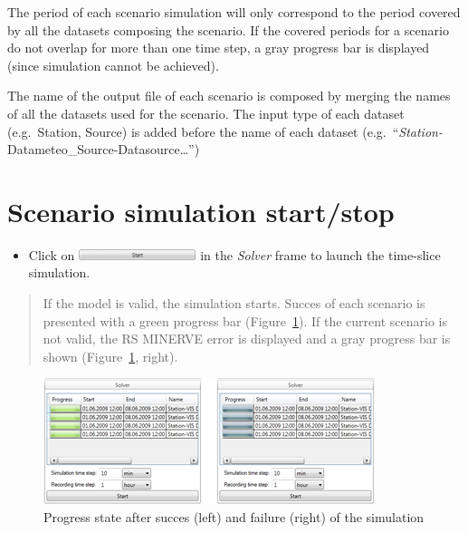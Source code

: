 \documentclass[
  letterpaper,
  DIV=11,
  numbers=noendperiod]{scrreprt}
\providecommand{\tightlist}{%
  \setlength{\itemsep}{0pt}\setlength{\parskip}{0pt}}\usepackage{longtable,booktabs,array}
\begin{document}
The period of each scenario simulation will only correspond to the
period covered by all the datasets composing the scenario. If the
covered periods for a scenario do not overlap for more than one time
step, a gray progress bar is displayed (since simulation cannot be
achieved).

The name of the output file of each scenario is composed by merging the
names of all the datasets used for the scenario. The input type of each
dataset (e.g.~Station, Source) is added before the name of each dataset
(e.g.~``\emph{Station-}Datameteo\_Source-Datasource\ldots{}'')

\hypertarget{scenario-simulation-startstop}{%
\section{Scenario simulation
start/stop}\label{scenario-simulation-startstop}}

\begin{itemize}
\tightlist
\item
  {Click on
  \includegraphics[width=\textwidth,height=0.12in]{./figures/fig-icon_calibrator_start.png}
  in the \emph{Solver} frame to launch the time-slice simulation.}
\end{itemize}

\begin{quote}
If the model is valid, the simulation starts. Succes of each scenario is
presented with a green progress bar
(Figure~\ref{fig-scenario_simulation_progress_simulation}). If the
current scenario is not valid, the RS MINERVE error is displayed and a
gray progress bar is shown
(Figure~\ref{fig-scenario_simulation_progress_simulation}, right).
\end{quote}

\begin{figure}

{\centering \includegraphics{./figures/fig-scenario_simulation_progress_simulation.png}

}

\caption{\label{fig-scenario_simulation_progress_simulation}Progress
state after succes (left) and failure (right) of the simulation}

\end{figure}
\end{document}
